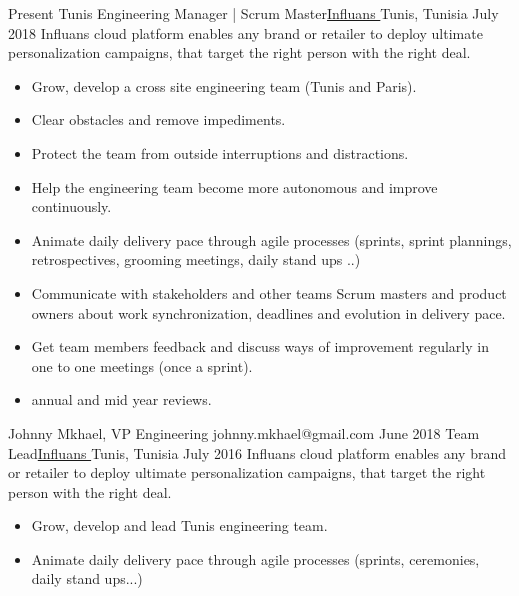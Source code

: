 %
%
%
\begin{experiences}
  \experienceWithReferenceNoTechno
  {Present}       {Tunis Engineering Manager | Scrum Master}{\href{https://www.influans.com}{Influans \faExternalLink}}{Tunis, Tunisia}
  {July 2018}      {Influans cloud platform enables any brand or retailer to deploy ultimate personalization campaigns, that target the right person with the right deal.}
    {
      \begin{itemize}
        \item Grow, develop a cross site engineering team (Tunis and Paris).
        \item Clear obstacles and remove impediments.
        \item Protect the team from outside interruptions and distractions.
        \item Help the engineering team become more autonomous and improve continuously.
        \item Animate daily delivery pace through agile processes (sprints, sprint plannings, retrospectives, grooming meetings, daily stand ups ..)
        \item Communicate with stakeholders and other teams Scrum masters and product owners about work synchronization, deadlines and evolution in delivery pace.
        \item Get team members feedback and discuss ways of improvement regularly in one to one meetings (once a sprint).
        \item annual and mid year reviews.
      \end{itemize}
    }
    {Johnny Mkhael, VP Engineering} {johnny.mkhael@gmail.com}
  \emptySeparator   
  \experienceWithReferenceNoTechno
    {June 2018}       {Team Lead}{\href{https://www.influans.com}{Influans \faExternalLink}}{Tunis, Tunisia}
    {July 2016}      {Influans cloud platform enables any brand or retailer to deploy ultimate personalization campaigns, that target the right person with the right deal.}
    {
      \begin{itemize}
        \item Grow, develop and lead Tunis engineering team.
        \item Animate daily delivery pace through agile processes (sprints, ceremonies, daily stand ups...)

\end{itemize}}
\end{experiences}
